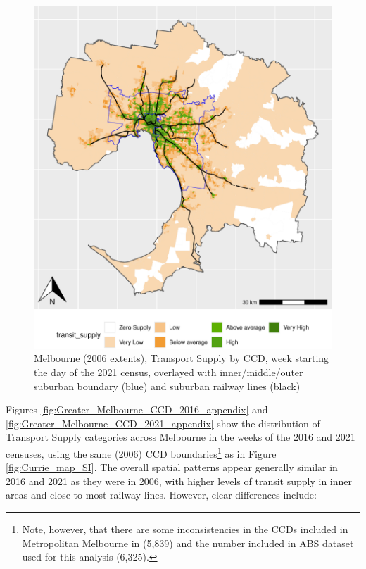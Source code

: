 \documentclass[preprint, 3p,
authoryear]{elsarticle} %
\begin{document}
\begin{figure}
\centering
\includegraphics{Leveraging_GTFS_to_assess_transit_supply_Transport_Geography_files/figure-latex/Greater_Melbourne_CCD_2021_appendix-1.pdf}
\caption{Melbourne (2006 extents), Transport Supply by CCD, week
starting the day of the 2021 census, overlayed with inner/middle/outer
suburban boundary (blue) and suburban railway lines (black)}
\end{figure}

Figures \ref{fig:Greater_Melbourne_CCD_2016_appendix} and
\ref{fig:Greater_Melbourne_CCD_2021_appendix} show the distribution of
Transport Supply categories across Melbourne in the weeks of the 2016
and 2021 censuses, using the same (2006) CCD boundaries\footnote{Note,
  however, that there are some inconsistencies in the CCDs included in
  Metropolitan Melbourne in \citet{currie2010identifying} (5,839) and
  the number included in ABS dataset used for this analysis (6,325).} as
in Figure \ref{fig:Currie_map_SI}. The overall spatial patterns appear
generally similar in 2016 and 2021 as they were in 2006, with higher
levels of transit supply in inner areas and close to most railway lines.
However, clear differences include:
\end{document}
